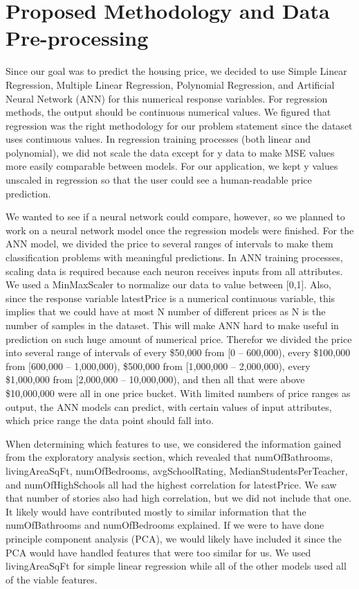 \documentclass[12pt]{article}
\begin{document}
	\section{Proposed Methodology and Data Pre-processing}
	
	Since our goal was to predict the housing price, we decided to use Simple Linear Regression, Multiple Linear Regression, Polynomial Regression, and Artificial Neural Network (ANN) for this numerical response variables. For regression methods, the output should be continuous numerical values. We figured that regression was the right methodology for our problem statement since the dataset uses continuous values. In regression training processes (both linear and polynomial), we did not scale the data except for y data to make MSE values more easily comparable between models. For our application, we kept y values unscaled in regression so that the user could see a human-readable price prediction.
	
	We wanted to see if a neural network could compare, however, so we planned to work on a neural network model once the regression models were finished. For the ANN model, we divided the price to several ranges of intervals to make them classification problems with meaningful predictions. In ANN training processes, scaling data is required because each neuron receives inputs from all attributes. We used a MinMaxScaler to normalize our data to value between [0,1]. Also, since the response variable latestPrice is a numerical continuous variable, this implies that we could have at most N number of different prices as N is the number of samples in the dataset. This will make ANN hard to make useful in prediction on such huge amount of numerical price. Therefor we divided the price into several range of intervals of every \$50,000 from [0 – 600,000), every \$100,000 from [600,000 – 1,000,000), \$500,000 from [1,000,000 – 2,000,000), every \$1,000,000 from [2,000,000 – 10,000,000), and then all that were above \$10,000,000 were all in one price bucket. With limited numbers of price ranges as output, the ANN models can predict, with certain values of input attributes, which price range the data point should fall into.
	
	When determining which features to use, we considered the information gained from the exploratory analysis section, which revealed that numOfBathrooms, livingAreaSqFt, numOfBedrooms, avgSchoolRating, MedianStudentsPerTeacher, and numOfHighSchools all had the highest correlation for latestPrice. We saw that number of stories also had high correlation, but we did not include that one. It likely would have contributed mostly to similar information that the numOfBathrooms and numOfBedrooms explained. If we were to have done principle component analysis (PCA), we would likely have included it since the PCA would have handled features that were too similar for us. We used livingAreaSqFt for simple linear regression while all of the other models used all of the viable features.
	
\end{document}
